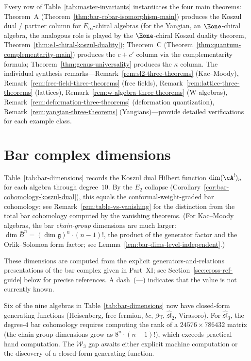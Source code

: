 Every row of Table~\ref{tab:master-invariants} instantiates the four main
theorems:
Theorem~A (Theorem~\ref{thm:bar-cobar-isomorphism-main}) produces the
Koszul dual / partner column for $E_\infty$-chiral algebras (for the
Yangian, an $\Eone$-chiral algebra, the analogous role is played by
the $\Eone$-chiral Koszul duality theorem,
Theorem~\ref{thm:e1-chiral-koszul-duality});
Theorem~C (Theorem~\ref{thm:quantum-complementarity-main}) produces the
$c + c'$ column via the complementarity formula;
Theorem~\ref{thm:genus-universality} produces the $\kappa$ column.
The individual synthesis remarks---Remark~\ref{rem:sl2-three-theorems}
(Kac--Moody), Remark~\ref{rem:free-field-three-theorems} (free fields),
Remark~\ref{rem:lattice-three-theorems} (lattices),
Remark~\ref{rem:w-algebra-three-theorems} (W-algebras),
Remark~\ref{rem:deformation-three-theorems} (deformation quantization),
Remark~\ref{rem:yangian-three-theorems} (Yangians)---provide
detailed verifications for each example class.


\section*{Bar complex dimensions}
\label{sec:bar-dimensions}

Table~\ref{tab:bar-dimensions} records the Koszul dual Hilbert
function $\dim (\cA^!)_n$ for each algebra through degree~$10$.
By the $E_2$ collapse (Corollary~\ref{cor:bar-cohomology-koszul-dual}),
this equals the conformal-weight-graded bar cohomology; see
Remark~\ref{rem:table-vs-vanishing} for the distinction from the
total bar cohomology computed by the vanishing theorems.
(For Kac--Moody algebras, the bar \emph{chain-group} dimensions are much
larger: $\dim \bar{B}^n = (\dim\mathfrak{g})^n \cdot (n{-}1)!$,
the product of the generator factor and the Orlik--Solomon form
factor; see Lemma~\ref{lem:bar-dims-level-independent}.)

These dimensions are computed from the explicit
generators-and-relations
presentations of the bar complex given in Part~XI;
see Section~\ref{sec:cross-ref-guide} below for precise references.
A dash~(---) indicates that the value is not currently known.

Six of the nine algebras in Table~\ref{tab:bar-dimensions} now have
closed-form generating functions (Heisenberg, free fermion, $bc$,
$\beta\gamma$, $\widehat{\mathfrak{sl}}_2$, Virasoro).
For $\widehat{\mathfrak{sl}}_3$, the degree-$4$ bar cohomology
requires computing the rank of a $24576 \times 786432$ matrix
(the chain-group dimensions grow as $8^n \cdot (n{-}1)!$),
which exceeds practical hand computation.  The $\mathcal{W}_3$ gap awaits either explicit machine
computation or the discovery of a closed-form generating function.

